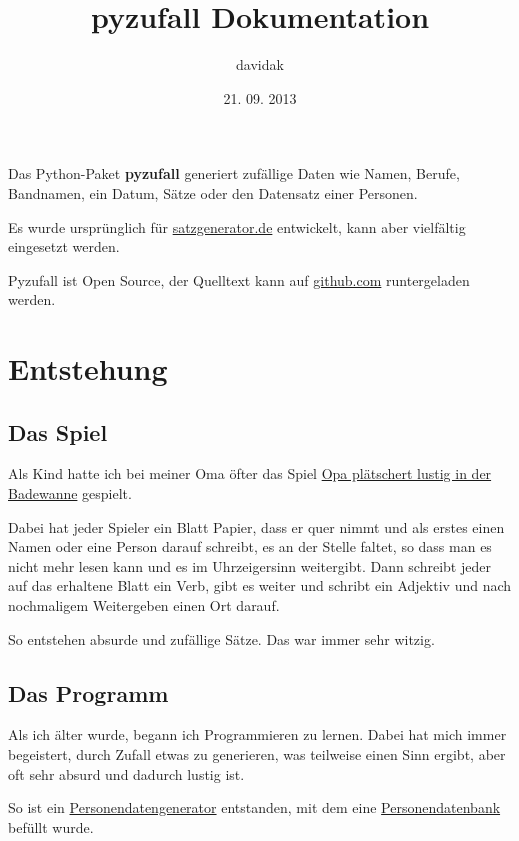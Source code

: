 \documentclass[a4paper,12pt,oneside]{sphinxmanual}
\title{pyzufall Dokumentation}
\date{21. 09. 2013}
\author{davidak}
\begin{document}
\maketitle
\tableofcontents
{}\label{index::doc}


Das Python-Paket \textbf{pyzufall} generiert zufällige Daten wie Namen, Berufe, Bandnamen, ein Datum, Sätze oder den Datensatz einer Personen.

Es wurde ursprünglich für \href{http://satzgenerator.de/}{satzgenerator.de} entwickelt, kann aber vielfältig eingesetzt werden.

Pyzufall ist Open Source, der Quelltext kann auf \href{https://github.com/davidak/pyzufall/}{github.com} runtergeladen werden.


\chapter{Entstehung}
\label{entstehung::doc}\label{entstehung:entstehung}\label{entstehung:dokumentation-von-pyzufall}

\section{Das Spiel}
\label{entstehung:das-spiel}
Als Kind hatte ich bei meiner Oma öfter das Spiel \href{http://www.mama-tipps.de/tipp/Opa-plaetschert-Badewanne.html}{Opa plätschert lustig in der Badewanne} gespielt.

Dabei hat jeder Spieler ein Blatt Papier, dass er quer nimmt und als erstes einen Namen oder eine Person darauf schreibt, es an der Stelle faltet, so dass man es nicht mehr lesen kann und es im Uhrzeigersinn weitergibt. Dann schreibt jeder auf das erhaltene Blatt ein Verb, gibt es weiter und schribt ein Adjektiv und nach nochmaligem Weitergeben einen Ort darauf.

So entstehen absurde und zufällige Sätze. Das war immer sehr witzig.


\section{Das Programm}
\label{entstehung:das-programm}
Als ich älter wurde, begann ich Programmieren zu lernen. Dabei hat mich immer begeistert, durch Zufall etwas zu generieren, was teilweise einen Sinn ergibt, aber oft sehr absurd und dadurch lustig ist.

So ist ein \href{http://davidak.de/wiki/perl/personendatengenerator}{Personendatengenerator} entstanden, mit dem eine \href{http://davidak.de/personen/}{Personendatenbank} befüllt wurde.
\end{document}
